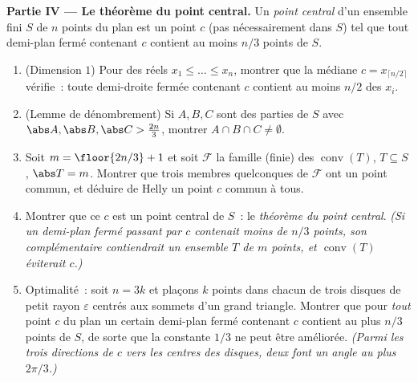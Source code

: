 \begin{problem}
\medskip
\noindent\textbf{Partie IV --- Le théorème du point central.} Un
\emph{point central} d'un ensemble fini $S$ de $n$ points du
plan est un point $c$ (pas nécessairement dans $S$) tel que tout
demi-plan fermé contenant $c$ contient au moins $n/3$
points de $S$.
\begin{enumerate}[resume]
  \item (Dimension $1$) Pour des réels $x_1 \leq \dots \leq x_n$,
        montrer que la médiane $c = x_{\lceil n/2 \rceil}$
        vérifie~: toute demi-droite fermée contenant $c$
        contient au moins $n/2$ des $x_i$.
  \item (Lemme de dénombrement) Si $A, B, C$ sont des parties de $S$
        avec $\abs A, \abs B, \abs C > \tfrac{2n}3$, montrer $A \cap
        B \cap C \neq \emptyset$.
  \item Soit $m = \floor{2n/3} + 1$ et soit $\mathcal F$
        la famille (finie) des 
        $\operatorname{conv}(T)$, $T \subseteq S$, $\abs T =
        m$. Montrer que trois membres quelconques de $\mathcal F$ ont
        un point commun, et déduire de Helly un point $c$
        commun à tous.
  \item Montrer que ce $c$ est un point central de $S$~: le
        \emph{théorème du point central}. \emph{(Si un demi-plan fermé
        passant par $c$ contenait moins de $n/3$
        points, son complémentaire  contiendrait un ensemble $T$
        de $m$ points, et $\operatorname{conv}(T)$
        éviterait $c$.)}
  \item Optimalité~: soit $n = 3k$ et plaçons $k$ points dans
        chacun de trois disques de petit rayon $\varepsilon$ centrés
        aux sommets d'un grand triangle. Montrer que pour
        \emph{tout} point $c$ du plan un certain demi-plan
        fermé contenant $c$ contient au plus $n/3$
        points de $S$, de sorte que la constante $1/3$ ne peut être
        améliorée. \emph{(Parmi les trois directions de $c$
        vers les centres des disques, deux font un angle au plus
        $2\pi/3$.)}
\end{enumerate}


\end{problem}
